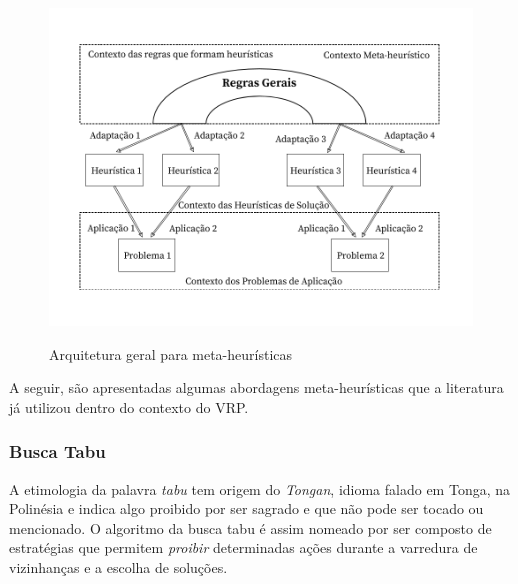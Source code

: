 \begin{figure}[H]
  \centering
  \caption{Arquitetura geral para meta-heurísticas}
 \includegraphics[scale=0.4]{imagens/metaheuristica.png} \par
\bigskip
\label{heuristica-goldbarg}
    \cite[p. 75]{goldbarg}
\end{figure}

A seguir, são apresentadas algumas abordagens meta-heurísticas que a literatura já utilizou dentro do contexto do VRP.


\subsubsection{Busca Tabu}

A etimologia da palavra \emph{tabu} tem origem do \emph{Tongan}, idioma falado em Tonga, na Polinésia e indica algo proibido por ser sagrado e que não pode ser tocado ou mencionado. O algoritmo da busca tabu é assim nomeado por ser composto de estratégias que permitem \emph{proibir} determinadas ações durante a varredura de vizinhanças e a escolha de soluções.

